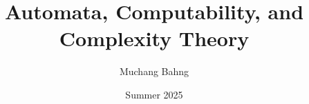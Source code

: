 \documentclass{article}
\newcounter{algo}[section]
\begin{document}
\title{Automata, Computability, and Complexity Theory}
\author{Muchang Bahng}
\date{Summer 2025}

\maketitle
\tableofcontents
\pagebreak















\end{document}
